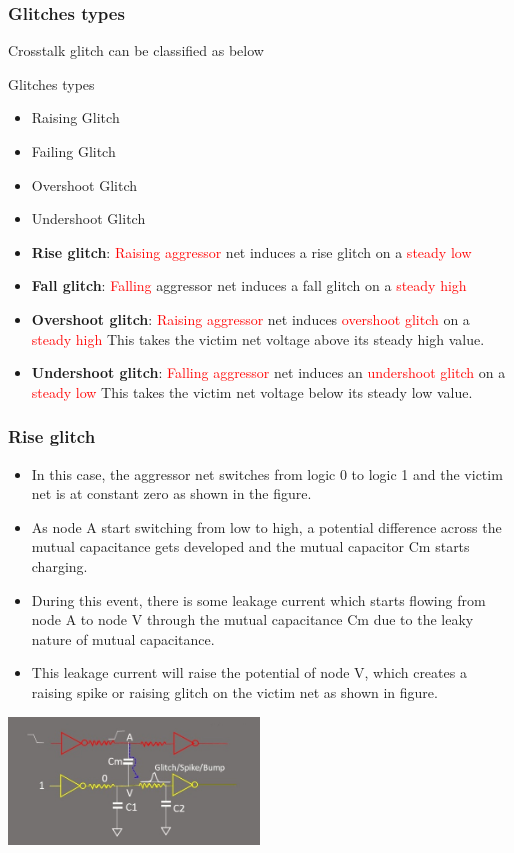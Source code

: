 \documentclass{beamer}
\begin{document}
	
	\begin{frame}
		\frametitle{Glitches types}
		Crosstalk glitch can be classified as below
	\begin{block}{Glitches types}
	\begin{itemize}
		\item Raising Glitch
		\item Failing Glitch
		\item Overshoot Glitch
		\item Undershoot Glitch
	\end{itemize}
\end{block}
\begin{itemize}
	\item \textbf{Rise glitch}: \textcolor{red}{Raising aggressor} net induces a rise glitch on a \textcolor{red}{steady low}
	\item \textbf{Fall glitch}: \textcolor{red}{Falling} aggressor net induces a fall glitch on a \textcolor{red}{steady high}
	\item\textbf{Overshoot glitch}: \textcolor{red}{Raising aggressor} net induces \textcolor{red}{overshoot glitch} on a \textcolor{red}{steady high} This takes the victim net voltage above its steady high value.
	\item \textbf{Undershoot glitch}: \textcolor{red}{Falling aggressor} net induces an \textcolor{red}{undershoot glitch} on a \textcolor{red}{steady low} This takes the victim net voltage below its steady low value.
\end{itemize}
	
	\end{frame}
	\begin{frame}
		\frametitle{Rise glitch}
		\begin{itemize}
			\item In this case, the aggressor net switches from logic 0 to logic 1 and the victim net is at constant zero as shown in the figure.
			\item As node A start switching from low to high, a potential difference across the mutual capacitance gets developed and the mutual capacitor Cm starts charging.
			\item During this event, there is some leakage current which starts flowing from node A to node V through the mutual capacitance Cm due to the leaky nature of mutual capacitance.
			\item This leakage current will raise the potential of node V, which creates a raising spike or raising glitch on the victim net as shown in figure.
		\end{itemize}
	\begin{center}
				\includegraphics[width=0.5\textwidth]{crosstalk_noise1}
	\end{center}
\end{frame}
\end{document}
